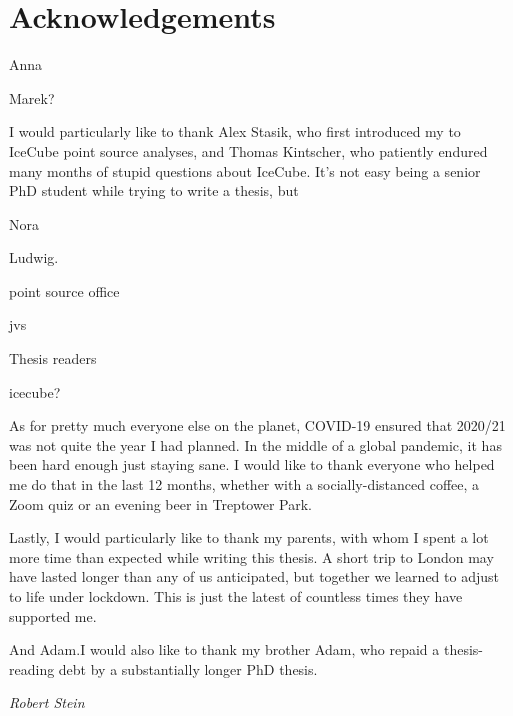 \chapter*{Acknowledgements}

Anna

Marek?

I would particularly like to thank Alex Stasik, who first introduced my to IceCube point source analyses, and Thomas Kintscher, who patiently endured many months of stupid questions about IceCube. It's not easy being a senior PhD student while trying to write a thesis, but 

Nora 

Ludwig.

point source office 

jvs

Thesis readers

icecube?

As for pretty much everyone else on the planet, COVID-19 ensured that 2020/21 was not quite the year I had planned. In the middle of a global pandemic, it has been hard enough just staying sane. I would like to thank everyone who helped me do that in the last 12 months, whether with a socially-distanced coffee, a Zoom quiz or an evening beer in Treptower Park.

Lastly, I would particularly like to thank my parents, with whom I spent a lot more time than expected while writing this thesis. A short trip to London may have lasted  longer than any of us anticipated, but together we learned to adjust to life under lockdown. This is just the latest of countless times they have supported me.

And Adam.I would also like to thank my brother Adam, who repaid a thesis-reading debt by  a substantially longer PhD thesis. 

\begin{flushright}
	\textit{Robert Stein}
\end{flushright}

